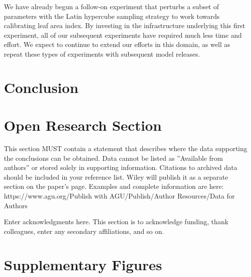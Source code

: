 \documentclass[draft]{agujournal2019}
\begin{document}
We have already begun a follow-on experiment that perturbs a subset of parameters with the Latin hypercube sampling strategy to work towards calibrating leaf area index. By investing in the infrastructure underlying this first experiment, all of our subsequent experiments have required much less time and effort. We expect to continue to extend our efforts in this domain, as well as repeat these types of experiments with subsequent model releases.

\section{Conclusion}
\section*{Open Research Section}
This section MUST contain a statement that describes where the data supporting the conclusions can be obtained. Data cannot be listed as ''Available from authors'' or stored solely in supporting information. Citations to archived data should be included in your reference list. Wiley will publish it as a separate section on the paper’s page. Examples and complete information are here:
https://www.agu.org/Publish with AGU/Publish/Author Resources/Data for Authors


\acknowledgments
Enter acknowledgments here. This section is to acknowledge funding, thank colleagues, enter any secondary affiliations, and so on.






\appendix
\section{Supplementary Figures}
\end{document}
